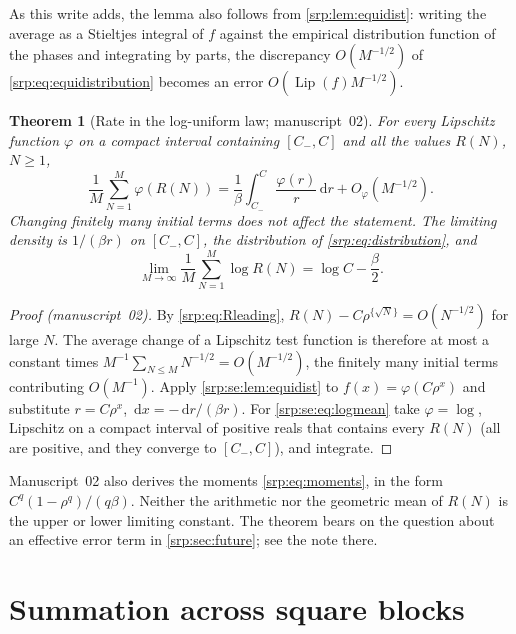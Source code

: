 \documentclass[11pt,a4paper]{article}
\numberwithin{equation}{section}
\newtheorem{theorem}{Theorem}[section]
\theoremstyle{definition}
\theoremstyle{remark}
\newcommand{\dd}{\,\mathrm d}
\begin{document}
As this write adds, the lemma also follows from \cref{srp:lem:equidist}:
writing the average as
a Stieltjes integral of $f$ against the empirical distribution function of
the phases and integrating by parts, the discrepancy $O(M^{-1/2})$ of
\eqref{srp:eq:equidistribution} becomes an error $O(\operatorname{Lip}(f)M^{-1/2})$.

\begin{theorem}[Rate in the log-uniform law; manuscript~02]
\label{srp:se:thm:law}
For every Lipschitz function $\varphi$ on a compact interval containing
$[C_-,C]$ and all the values $R(N)$, $N\ge1$,
\begin{equation}
 \frac1M\sum_{N=1}^M\varphi(R(N))
 =\frac1\beta\int_{C_-}^{C}\frac{\varphi(r)}r\dd r+O_\varphi(M^{-1/2}).
 \label{srp:se:eq:law}
\end{equation}
Changing finitely many initial terms does not affect the statement. The
limiting density is $1/(\beta r)$ on $[C_-,C]$, the distribution of
\eqref{srp:eq:distribution}, and
\begin{equation}
 \lim_{M\to\infty}\frac1M\sum_{N=1}^M\log R(N)=\log C-\frac\beta2.
 \label{srp:se:eq:logmean}
\end{equation}
\end{theorem}
\begin{proof}[Proof (manuscript~02)]
By \eqref{srp:eq:Rleading}, $R(N)-C\rho^{\{\sqrt N\}}=O(N^{-1/2})$ for large
$N$. The average change of a Lipschitz test function is therefore at most a
constant times $M^{-1}\sum_{N\le M}N^{-1/2}=O(M^{-1/2})$, the finitely many
initial terms contributing $O(M^{-1})$. Apply \cref{srp:se:lem:equidist}
to $f(x)=\varphi(C\rho^x)$ and substitute $r=C\rho^x$,
$\dd x=-\dd r/(\beta r)$. For \eqref{srp:se:eq:logmean} take
$\varphi=\log$, Lipschitz on a compact interval of positive reals that
contains every $R(N)$ (all are positive, and they converge to
$[C_-,C]$), and integrate.
\end{proof}

Manuscript~02 also derives the moments \eqref{srp:eq:moments}, in the form
$C^q(1-\rho^q)/(q\beta)$. Neither the arithmetic nor the geometric mean of
$R(N)$ is the upper or lower limiting constant. The theorem bears on the
question about an effective error term in \cref{srp:sec:future}; see the
note there.

\section{Summation across square blocks}
\label{srp:sec:summation}
\end{document}
